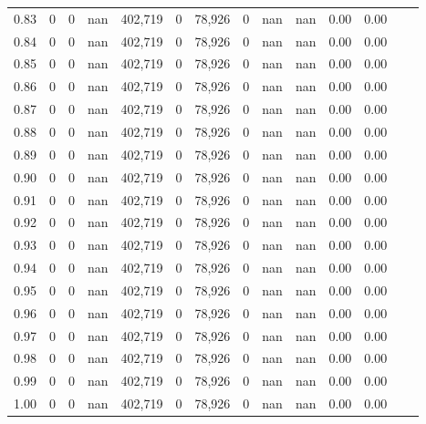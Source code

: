 \begin{tabular}{rrrrrrrrrrrrrr}
0.83 &       0 &      0 &      nan &  402,719 &        0 &  78,926 &       0 &   nan &   nan &  0.00 &      0.00 \\
0.84 &       0 &      0 &      nan &  402,719 &        0 &  78,926 &       0 &   nan &   nan &  0.00 &      0.00 \\
0.85 &       0 &      0 &      nan &  402,719 &        0 &  78,926 &       0 &   nan &   nan &  0.00 &      0.00 \\
0.86 &       0 &      0 &      nan &  402,719 &        0 &  78,926 &       0 &   nan &   nan &  0.00 &      0.00 \\
0.87 &       0 &      0 &      nan &  402,719 &        0 &  78,926 &       0 &   nan &   nan &  0.00 &      0.00 \\
0.88 &       0 &      0 &      nan &  402,719 &        0 &  78,926 &       0 &   nan &   nan &  0.00 &      0.00 \\
0.89 &       0 &      0 &      nan &  402,719 &        0 &  78,926 &       0 &   nan &   nan &  0.00 &      0.00 \\
0.90 &       0 &      0 &      nan &  402,719 &        0 &  78,926 &       0 &   nan &   nan &  0.00 &      0.00 \\
0.91 &       0 &      0 &      nan &  402,719 &        0 &  78,926 &       0 &   nan &   nan &  0.00 &      0.00 \\
0.92 &       0 &      0 &      nan &  402,719 &        0 &  78,926 &       0 &   nan &   nan &  0.00 &      0.00 \\
0.93 &       0 &      0 &      nan &  402,719 &        0 &  78,926 &       0 &   nan &   nan &  0.00 &      0.00 \\
0.94 &       0 &      0 &      nan &  402,719 &        0 &  78,926 &       0 &   nan &   nan &  0.00 &      0.00 \\
0.95 &       0 &      0 &      nan &  402,719 &        0 &  78,926 &       0 &   nan &   nan &  0.00 &      0.00 \\
0.96 &       0 &      0 &      nan &  402,719 &        0 &  78,926 &       0 &   nan &   nan &  0.00 &      0.00 \\
0.97 &       0 &      0 &      nan &  402,719 &        0 &  78,926 &       0 &   nan &   nan &  0.00 &      0.00 \\
0.98 &       0 &      0 &      nan &  402,719 &        0 &  78,926 &       0 &   nan &   nan &  0.00 &      0.00 \\
0.99 &       0 &      0 &      nan &  402,719 &        0 &  78,926 &       0 &   nan &   nan &  0.00 &      0.00 \\
1.00 &       0 &      0 &      nan &  402,719 &        0 &  78,926 &       0 &   nan &   nan &  0.00 &      0.00 \\
\bottomrule
\end{tabular}
